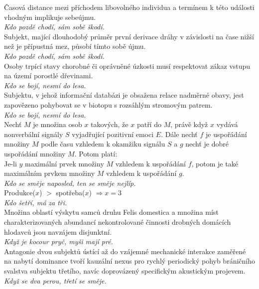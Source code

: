 \begin{multicols}{\value{columnsgames}}
\noindent
Časová distance mezi příchodem libovolného individua a termínem
k této události vhodným implikuje sebeújmu.\\[1 mm]
{\sl Kdo pozdě chodí, sám sobě škodí.}\\

\noindent
Subjekt, mající dlouhodobý průměr první derivace dráhy v
závislosti na čase nižší než je přípustná mez, působí tímto sobě
újmu.\\[1 mm]
{\sl Kdo pozdě chodí, sám sobě škodí.}\\

\noindent
Osoby trpící stavy chorobné či oprávněné úzkosti musí respektovat
zákaz vstupu na území porostlé dřevinami.\\[1 mm]
{\sl Kdo se bojí, nesmí do lesa.}\\

\noindent
Subjektu, v jehož informační databázi je obsažena relace
nadměrné obavy, jest zapovězeno pohybovat se v biotopu s rozsáhlým
stromovým patrem.\\[1 mm]
{\sl Kdo se bojí, nesmí do lesa.}\\

\noindent
Nechť $M$ je množina osob $x$ takových, že $x$ patří do $M$, právě když
$x$ vydává nonverbální signály $S$ vyjadřující pozitivní emoci $E$. Dále nechť
$f$ je uspořádání množiny $M$ podle času vzhledem k okamžiku signálu $S$ a
$g$ nechť je dobré uspořádání množiny $M$. Potom platí:\\
Je-li $y$ maximální prvek množiny $M$ vzhledem k uspořádání $f$, potom je také
maximálním prvkem množiny $M$ vzhledem k uspořádání $g$.\\[1 mm]
{\sl Kdo se směje naposled, ten se směje nejlíp.}\\

\noindent
Produkce($x$) $>$ spotřeba($x$) $\Rightarrow x = 3$\\[1 mm]
{\sl Kdo šetří, má za tři.}\\

\noindent
Množina oblastí výskytu samců druhu Felis domestica a množina
míst charakterizovaných abundancí nekontrolované činnosti drobných
domácích hlodavců jsou navzájem disjunktní.\\[1 mm]
{\sl Když je kocour pryč, myši mají pré.}\\

\noindent
Antagonie dvou subjektů ústící až do vzájemné mechanické
interakce zaměřené na nabytí dominance tvoří kauzální nexus pro
rychlý periodický pohyb bráničního svalstva subjektu třetího,
navíc doprovázený specifickým akustickým projevem.\\[1 mm]
{\sl Když se dva perou, třetí se směje.}\\


\end{multicols}
